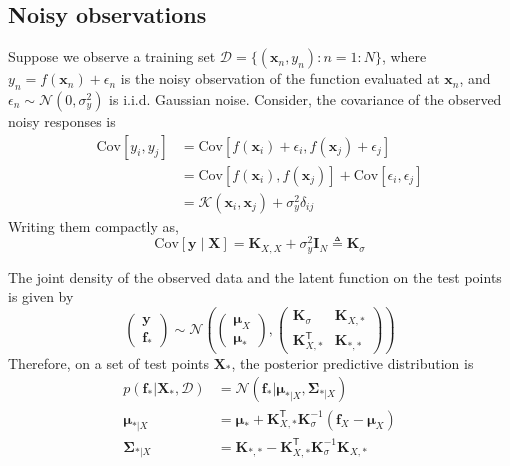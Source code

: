 \documentclass[11pt]{article}
\begin{document}
\subsection{Noisy observations}
Suppose we observe a training set $\mathcal{D} = \{(\boldsymbol{x}_n, y_n) : n = 1:N\}$, where $y_n = f(\boldsymbol{x}_n) + \epsilon_n$ is the noisy observation of the function evaluated at $\boldsymbol{x}_n$, and $\epsilon_n \sim \mathcal{N}(0, \sigma_y^2)$ is i.i.d. Gaussian noise.
Consider, the covariance of the observed noisy responses is 
\[
\begin{aligned}
\text{Cov}[y_i, y_j] &= \text{Cov}[f(\boldsymbol{x}_i) + \epsilon_i, f(\boldsymbol{x}_j) + \epsilon_j] \\
&= \text{Cov}[f(\boldsymbol{x}_i), f(\boldsymbol{x}_j)] + \text{Cov}[\epsilon_i, \epsilon_j] \\
&= \mathcal{K}(\boldsymbol{x}_i, \boldsymbol{x}_j) + \sigma_y^2 \delta_{ij}
\end{aligned}
\]
Writing them compactly as,
\[
\text{Cov}[\boldsymbol{y} \mid \mathbf{X}] = \mathbf{K}_{X,X} + \sigma_y^2 \mathbf{I}_N \triangleq \mathbf{K}_{\sigma}
\]

The joint density of the observed data and the latent function on the test points is given by
\[
\begin{pmatrix} \boldsymbol{y} \\ \boldsymbol{f}_* \end{pmatrix} \sim \mathcal{N} \left( \begin{pmatrix} \boldsymbol{\mu}_X \\ \boldsymbol{\mu}_* \end{pmatrix}, \begin{pmatrix} \mathbf{K}_{\sigma} & \mathbf{K}_{X,*} \\ \mathbf{K}_{X,*}^\mathsf{T} & \mathbf{K}_{*,*} \end{pmatrix} \right)
\]
Therefore, on a set of test points $\mathbf{X}_*$, the posterior predictive distribution is
\[
\begin{aligned}
p(\boldsymbol{f}_* | \mathbf{X}_*, \mathcal{D}) &= \mathcal{N}(\boldsymbol{f}_* | \boldsymbol{\mu}_{*|X}, \boldsymbol{\Sigma}_{*|X}) \\
\boldsymbol{\mu}_{*|X} &= \boldsymbol{\mu}_* + \mathbf{K}_{X,*}^\mathsf{T} \mathbf{K}_{\sigma}^{-1} (\boldsymbol{f}_X - \boldsymbol{\mu}_X) \\
\boldsymbol{\Sigma}_{*|X} &= \mathbf{K}_{*,*} - \mathbf{K}_{X,*}^\mathsf{T} \mathbf{K}_{\sigma}^{-1} \mathbf{K}_{X,*}
\end{aligned}
\]
\end{document}
